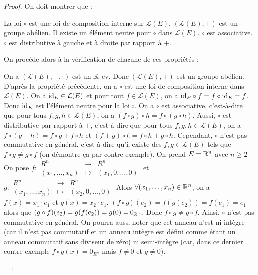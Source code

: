 \documentclass[12pt,a4paper]{report}
\begin{document}
\begin{proof}
    On doit montrer que :
    \begin{outline}
        \1 La loi $\circ$ est une loi de composition interne sur $\mathcal L(E)$.
        \1 $(\mathcal L(E), +)$ est un groupe abélien.
        \1 Il existe un élément neutre pour $\circ$ dans $\mathcal L(E)$.
        \1 $\circ$ est associative.
        \1 $\circ$ est distributive à gauche et à droite par rapport à $+$.
    \end{outline}
    On procède alors à la vérification de chacune de ces propriétés :
    \begin{outline}
        \1 On a $(\mathcal L(E), +, \cdot)$ est un $\mathbb{K}$-ev. Donc $(\mathcal L(E), +)$ est un groupe abélien.
        \1 D'après la propriété précédente, on a $\circ$ est une loi de composition interne dans $\mathcal L(E)$.
        \1 On a $\mathrm{id}_E \in \mathcal L(E)$ et pour tout $f \in \mathcal L(E)$, on a $\mathrm{id}_E \circ f = f \circ \mathrm{id}_E = f$. Donc $\mathrm{id}_E$ est l'élément neutre pour la loi $\circ$.
        \1 On a $\circ$ est associative, c'est-à-dire que pour tous $f,g,h \in \mathcal L(E)$, on a $(f \circ g) \circ h = f \circ (g \circ h)$.
        \1 Aussi, $\circ$ est distributive par rapport à $+$, c'est-à-dire que pour tous $f,g,h \in \mathcal L(E)$, on a $f \circ (g + h) = f \circ g + f \circ h$ et $(f + g) \circ h = f \circ h + g \circ h$.
        \1 Cependant, $\circ$ n'est pas commutative en général, c'est-à-dire qu'il existe des $f,g \in \mathcal L(E)$ tels que $f \circ g \neq g \circ f$ (on démontre ça par contre-exemple).
            \2 On prend $E = \mathbb{R}^n$ avec $n \ge 2$
            \2 On pose $f : \begin{matrix}
            R^n &\to &R^n\\
            (x_1,\dots,x_n) &\mapsto &(x_1,0,\dots,0)
            \end{matrix}$ et $g : \begin{matrix}
            R^n &\to &R^n\\
            (x_1,\dots,x_n) &\mapsto &(x_2,0,\dots,0)
            \end{matrix}$
            \2 Alors $\forall (x_1,\dots,x_n) \in \mathbb{R}^n$, on a $f(x) = x_1\cdot e_1$ et $g(x) = x_2\cdot e_1$.
            \2 $(f \circ g)(e_2) = f(g(e_2)) = f(e_1) = e_1$ alors que $(g \circ f)(e_2) = g(f(e_2)) = g(0) = 0_{\mathbb{R}^n}$. Donc $f \circ g \neq g \circ f$.
            \2 Ainsi, $\circ$ n'est pas commutative en général.
            \3 On pourra aussi noter que cet anneau n'est ni intègre (car il n'est pas commutatif et un anneau intègre est défini comme étant un anneau commutatif sans diviseur de zéro) ni semi-intègre (car, dans ce dernier contre-exemple $f\circ g(x) = 0_{R^n}$ mais $f \neq 0$ et $g \neq 0$).
    \end{outline}
\end{proof}
\end{document}

